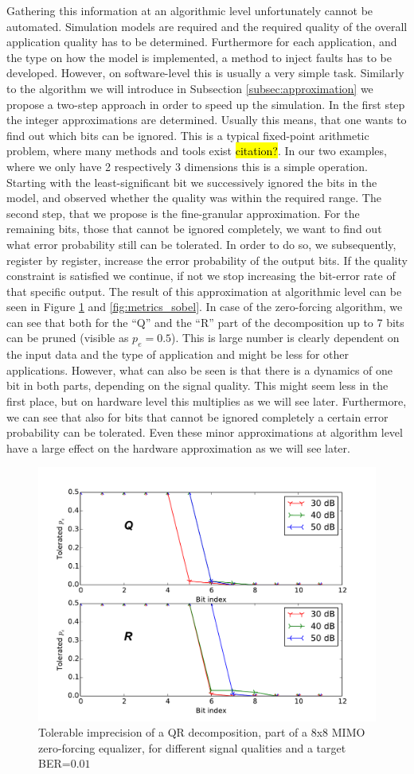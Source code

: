 \documentclass[conference]{IEEEtran}
\begin{document}
Gathering this information at an algorithmic level unfortunately cannot be automated. Simulation models are required and the required quality of the overall application quality has to be determined. Furthermore for each application, and the type on how the model is implemented, a method to inject faults has to be developed. However, on software-level this is usually a very simple task. Similarly to the algorithm we will introduce in Subsection \ref{subsec:approximation} we propose a two-step approach in order to speed up the simulation. In the first step the integer approximations are determined. Usually this means, that one wants to find out which bits can be ignored. This is a typical fixed-point arithmetic problem, where many methods and tools exist \hl{citation?}. In our two examples, where we only have 2 respectively 3 dimensions this is a simple operation. Starting with the least-significant bit we successively ignored the bits in the model, and observed whether the quality was within the required range. The second step, that we propose is the fine-granular approximation. For the remaining bits, those that cannot be ignored completely, we want to find out what error probability still can be tolerated. In order to do so, we subsequently, register by register, increase the error probability of the output bits. If the quality constraint is satisfied we continue, if not we stop increasing the bit-error rate of that specific output. The result of this approximation at algorithmic level can be seen in Figure \ref{fig:metrics_qr} and \ref{fig:metrics_sobel}. In case of the zero-forcing algorithm, we can see that both for the ``Q'' and the ``R'' part of the decomposition up to 7 bits can be pruned (visible as $p_e=0.5$). This is large number is clearly dependent on the input data and the type of application and might be less for other applications. However, what can also be seen is that there is a dynamics of one bit in both parts, depending on the signal quality. This might seem less in the first place, but on hardware level this multiplies as we will see later. Furthermore, we can see that also for bits that cannot be ignored completely a certain error probability can be tolerated. Even these minor approximations at algorithm level have a large effect on the hardware approximation as we will see later.
\begin{figure}[tb]
  \centering
  \includegraphics[width=.5\textwidth]{figs/metrics_qr}
  \caption{Tolerable imprecision of a QR decomposition, part of a 8x8 MIMO zero-forcing equalizer, for different signal qualities and a target BER=$0.01$}
  \label{fig:metrics_qr}
\end{figure}
\end{document}
